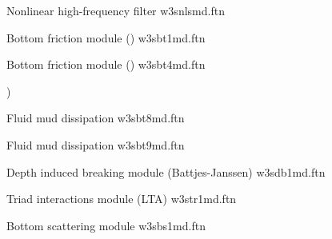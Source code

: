 \vspace{\baselineskip}
\noindent
Nonlinear high-frequency filter \hfill {\file w3snlsmd.ftn}

\begin{flisti}
\end{flisti}

\noindent
Bottom friction module (\js) \hfill {\file w3sbt1md.ftn}

\begin{flisti}
\end{flisti}

\noindent
Bottom friction module (\showex) \hfill {\file w3sbt4md.ftn}

\begin{flisti}
)
\end{flisti}

\noindent
Fluid mud dissipation \citep{art:DL78}  \hfill {\file w3sbt8md.ftn}

\begin{flisti}
\end{flisti}

\pb \noindent
Fluid mud dissipation \citep{art:Ng00}  \hfill {\file w3sbt9md.ftn}

\begin{flisti}
\end{flisti}

\noindent
Depth induced breaking module (Battjes-Janssen) \hfill {\file w3sdb1md.ftn}

\begin{flisti}
\end{flisti}

\noindent
Triad interactions module (LTA) \hfill {\file w3str1md.ftn}

\begin{flisti}
\end{flisti}

\noindent
Bottom scattering module \hfill {\file w3sbs1md.ftn}

\begin{flisti}
\end{flisti}

